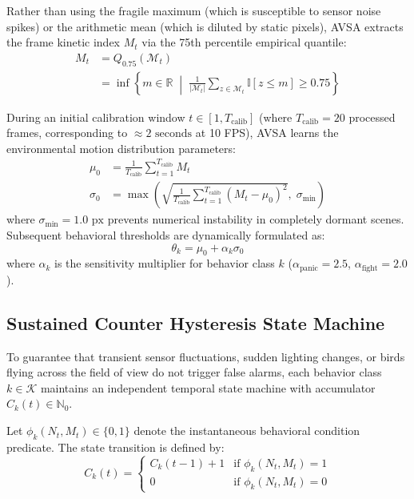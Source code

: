 \documentclass[conference]{IEEEtran}
\begin{document}
Rather than using the fragile maximum (which is susceptible to sensor noise spikes) or the arithmetic mean (which is diluted by static pixels), AVSA extracts the frame kinetic index $M_t$ via the 75th percentile empirical quantile:
\begin{align}
M_t &= Q_{0.75}(\mathcal{M}_t) \nonumber \\
    &= \inf \left\{ m \in \mathbb{R} \;\middle|\; \frac{1}{|\mathcal{M}_t|} \sum_{z \in \mathcal{M}_t} \mathbb{I}[z \le m] \ge 0.75 \right\}
\end{align}

During an initial calibration window $t \in [1, T_{\text{calib}}]$ (where $T_{\text{calib}} = 20$ processed frames, corresponding to $\approx 2\text{ seconds}$ at 10 FPS), AVSA learns the environmental motion distribution parameters:
\begin{align}
\mu_0 &= \frac{1}{T_{\text{calib}}} \sum_{t=1}^{T_{\text{calib}}} M_t \\
\sigma_0 &= \max\left(\sqrt{\frac{1}{T_{\text{calib}}} \sum_{t=1}^{T_{\text{calib}}} (M_t - \mu_0)^2}, \;\sigma_{\min}\right)
\end{align}
where $\sigma_{\min} = 1.0\text{ px}$ prevents numerical instability in completely dormant scenes. Subsequent behavioral thresholds are dynamically formulated as:
\begin{equation}
\theta_k = \mu_0 + \alpha_k \sigma_0
\end{equation}
where $\alpha_k$ is the sensitivity multiplier for behavior class $k$ ($\alpha_{\text{panic}} = 2.5$, $\alpha_{\text{fight}} = 2.0$).

\subsection{Sustained Counter Hysteresis State Machine}
To guarantee that transient sensor fluctuations, sudden lighting changes, or birds flying across the field of view do not trigger false alarms, each behavior class $k \in \mathcal{K}$ maintains an independent temporal state machine with accumulator $C_k(t) \in \mathbb{N}_0$.

Let $\phi_k(N_t, M_t) \in \{0, 1\}$ denote the instantaneous behavioral condition predicate. The state transition is defined by:
\begin{equation}
C_k(t) = 
\begin{cases}
C_k(t-1) + 1 & \text{if } \phi_k(N_t, M_t) = 1 \\
0 & \text{if } \phi_k(N_t, M_t) = 0
\end{cases}
\end{equation}
\end{document}
